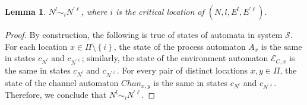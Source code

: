 \documentclass[11pt]{article}
\numberwithin{theorem}{section}
\newtheorem{lemma}[theorem]{Lemma}
\newcommand{\set}[1]{\left\{#1\right\}}
\begin{document}
\begin{lemma}\label{lem:forkSimilarModuloCriticalLocation}
$N^{l} \sim_i N^{\prime \ell}$, where $i$ is the critical location of $(N,l,E^l,E^{\prime \ell})$.
\end{lemma}
\begin{proof}
By construction, the following is true of states of automata in system $\mathcal{S}$. For each location $x \in \Pi \setminus \set{i}$, the state of the process automaton $A_x$ is the same in states $c_{N^l}$ and $c_{N^{\prime \ell}}$; similarly, the state of the environment automaton $\mathcal{E}_{C,x}$ is the same in states $c_{N^l}$ and $c_{N^{\prime \ell}}$. For every pair of distinct locations $x,y \in \Pi$, the state of the channel automaton $Chan_{x,y}$ is the same in states $c_{N^l}$ and $c_{N^{\prime \ell}}$. Therefore, we conclude that $N^{l} \sim_i N^{\prime \ell}$.
\end{proof}
\end{document}
